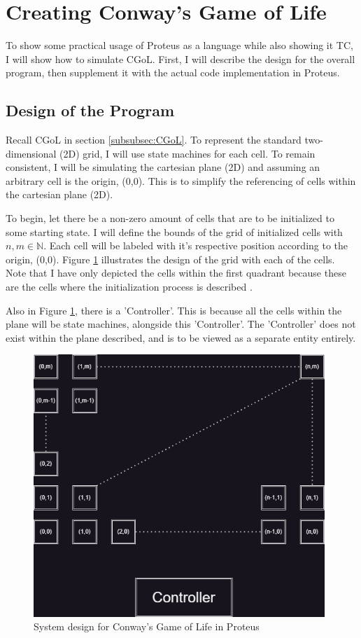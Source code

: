 \section{Creating Conway's Game of Life}\label{sec:ImplementCGoL}

To show some practical usage of Proteus as a language while also showing it TC, I will show how to simulate CGoL.
First, I will describe the design for the overall program, then supplement it with the actual code implementation in Proteus.

\subsection{Design of the Program}

Recall CGoL in section \ref{subsubsec:CGoL}.
To represent the standard two-dimensional (2D) grid, I will use state machines for each cell.
To remain consistent, I will be simulating the cartesian plane (2D) and assuming an arbitrary cell is the origin, (0,0).
This is to simplify the referencing of cells within the cartesian plane (2D).

To begin, let there be a non-zero amount of cells that are to be initialized to some starting state.
I will define the bounds of the grid of initialized cells with $n,m \in \mathbb{N}$.
Each cell will be labeled with it's respective position according to the origin, (0,0).
Figure \ref{fig:ProteusCGoLDesign} illustrates the design of the grid with each of the cells.
Note that I have only depicted the cells within the first quadrant because these are the cells where the initialization process is described \cite{CartesianPlane}.

Also in Figure \ref{fig:ProteusCGoLDesign}, there is a 'Controller'.
This is because all the cells within the plane will be state machines, alongside this 'Controller'.
The 'Controller' does not exist within the plane described, and is to be viewed as a separate entity entirely.

\begin{figure}[htb]
    \centering
    \includegraphics[width=11cm]{Images/CGoLDesign.png}
       \caption{System design for Conway's Game of Life in Proteus}
           \label{fig:ProteusCGoLDesign}
\end{figure}

